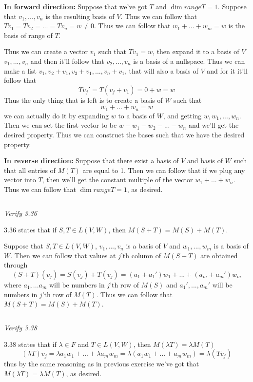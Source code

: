 \documentclass[11pt,oneside,titlepage]{book}
\begin{document}
\textbf{In forward direction: }
Suppose that we've got $T$ and $\dim range T = 1$.
Suppose that $v_1, ..., v_n$ is the resulting basis of $V$. Thus we can follow that
$T v_1 = T v_2 = ... = T v_n = w \neq 0$. Thus we can follow that $w_1 + ... + w_m = w$ is
the basis of range of $T$.

Thus we can create a vector $v_1$ such that $T v_1 = w$, then expand it to a basis of
$V$ $v_1, ..., v_n$ and then it'll follow that $v_2, ..., v_n$ is a basis of a nullspace.
Thus we can make a list $v_1, v_2 + v_1, v_3 + v_1, ..., v_n + v_1$, that will also a
basis of $V$ and for it it'll follow that
$$T v_j' = T (v_j + v_1) = 0 + w = w$$
Thus the only thing that is left is to create a basis of $W$ such that
$$w_1 + ... + w_n = w$$
we can actually do it by expanding $w$ to a basis of $W$, and getting $w, w_1, ..., w_n$. Then
we can set the first vector to be $w - w_1 - w_2 - ... - w_n$ and we'll get the desired
property. Thus we can construct the bases such that we have the desired property.

\textbf{In reverse direction: }
Suppose that there exist a basis of $V$ and basis of $W$ such that all entries of $M(T)$  are
equal to 1. Then we can follow that if we plug any vector into $T$, then we'll get the
constant multiple of the vector $w_1 + ... + w_n$. Thus we can follow that
$\dim range T = 1$, as desired.

\subsection{}
\textit{Verify 3.36}

3.36 states that if $S, T \in L(V, W)$, then $M(S + T) = M(S) + M(T)$.

Suppose that $S, T \in L(V, W)$, $v_1, ..., v_n$ is a basis of $V$ and
$w_1, ..., w_m$ is a basis of $W$. Then we can follow that
values at $j$'th column of $M(S + T)$ are obtained through
$$(S + T)(v_j) =  S(v_j) + T(v_j) = (a_1 + a_1') w_1 + ... + (a_m + a_m')w_m$$
where $a_1, ... a_m$ will be numbers in $j$'th row of $M(S)$ and $a_1', ..., a_m'$ will
be numbers in $j$'th row of $M(T)$. Thus we can follow that $M(S + T) = M(S) + M(T)$.

\subsection{}

\textit{Verify 3.38}

3.38 states that if $\lambda \in F$ and $T \in L(V, W)$, then $M(\lambda T) = \lambda M(T)$
$$(\lambda T) v_j = \lambda a_1 w_1 + ... + \lambda a_m w_m =
\lambda (a_1 w_1 + ... + a_m w_m) = 
\lambda(T v_j)$$
thus by the same reasoning as in previous exercise we've got that $M(\lambda T) = \lambda M(T)$,
as desired.
\end{document}
